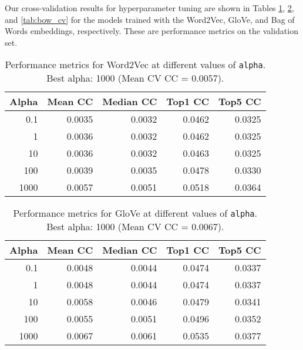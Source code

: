\documentclass[10pt,letterpaper]{article}
\begin{document}
Our cross-validation results for hyperparameter tuning are shown in Tables \ref{tab:word2vec_cv}, \ref{tab:glove_cv}, and \ref{tab:bow_cv} for the models trained with the Word2Vec, GloVe, and Bag of Words embeddings, respectively. These are performance metrics on the validation set.


\begin{table}[ht]
\centering
\caption{Performance metrics for Word2Vec at different values of \texttt{alpha}. Best alpha: 1000 (Mean CV CC = 0.0057).}
\label{tab:word2vec_cv}
\begin{tabular}{rrrrr}
\toprule
\textbf{Alpha} & \textbf{Mean CC} & \textbf{Median CC} & \textbf{Top1 CC} & \textbf{Top5 CC} \\
\midrule
0.1    & 0.0035 & 0.0032 & 0.0462 & 0.0325 \\
1      & 0.0036 & 0.0032 & 0.0462 & 0.0325 \\
10     & 0.0036 & 0.0032 & 0.0463 & 0.0325 \\
100    & 0.0039 & 0.0035 & 0.0478 & 0.0330 \\
1000   & 0.0057 & 0.0051 & 0.0518 & 0.0364 \\
\bottomrule
\end{tabular}
\end{table}

\begin{table}[ht]
\centering
\caption{Performance metrics for GloVe at different values of \texttt{alpha}. Best alpha: 1000 (Mean CV CC = 0.0067).}
\label{tab:glove_cv}
\begin{tabular}{rrrrr}
\toprule
\textbf{Alpha} & \textbf{Mean CC} & \textbf{Median CC} & \textbf{Top1 CC} & \textbf{Top5 CC} \\
\midrule
0.1    & 0.0048 & 0.0044 & 0.0474 & 0.0337 \\
1      & 0.0048 & 0.0044 & 0.0474 & 0.0337 \\
10     & 0.0058 & 0.0046 & 0.0479 & 0.0341 \\
100    & 0.0055 & 0.0051 & 0.0496 & 0.0352 \\
1000   & 0.0067 & 0.0061 & 0.0535 & 0.0377 \\
\bottomrule
\end{tabular}
\end{table}
\end{document}
